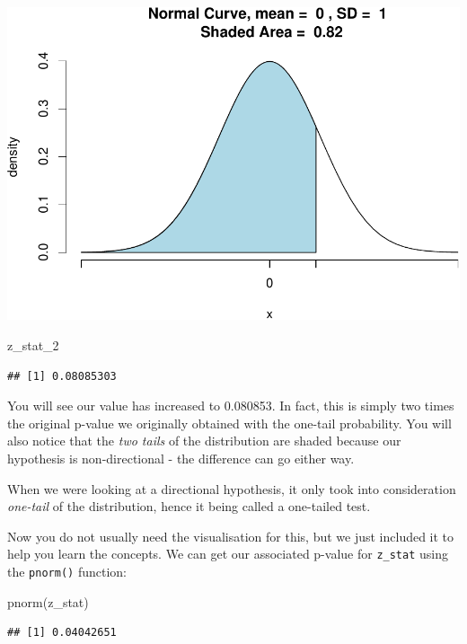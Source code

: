 \documentclass[
]{book}
\newenvironment{Shaded}{\begin{snugshade}}{\end{snugshade}}
\newcommand{\FunctionTok}[1]{\textcolor[rgb]{0.00,0.00,0.00}{#1}}
\newcommand{\NormalTok}[1]{#1}
\begin{document}
\includegraphics{06-hypotheses_files/figure-latex/unnamed-chunk-30-1.pdf}

\begin{Shaded}
\begin{Highlighting}[]
\NormalTok{z\_stat\_2 }
\end{Highlighting}
\end{Shaded}

\begin{verbatim}
## [1] 0.08085303
\end{verbatim}

You will see our value has increased to 0.080853. In fact, this is simply two times the original p-value we originally obtained with the one-tail probability. You will also notice that the \emph{two tails} of the distribution are shaded because our hypothesis is non-directional - the difference can go either way.

When we were looking at a directional hypothesis, it only took into consideration \emph{one-tail} of the distribution, hence it being called a one-tailed test.

Now you do not usually need the visualisation for this, but we just included it to help you learn the concepts. We can get our associated p-value for \texttt{z\_stat} using the \texttt{pnorm()} function:

\begin{Shaded}
\begin{Highlighting}[]
\FunctionTok{pnorm}\NormalTok{(z\_stat)}
\end{Highlighting}
\end{Shaded}

\begin{verbatim}
## [1] 0.04042651
\end{verbatim}
\end{document}
